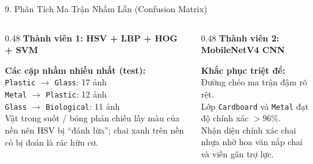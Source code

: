 \documentclass[aspectratio=169, 10pt]{beamer}
\begin{document}
\begin{frame}{9. Phân Tích Ma Trận Nhầm Lẫn (Confusion Matrix)}
\begin{columns}[T]
  \begin{column}{0.48\textwidth}
    \centering
    \textbf{Thành viên 1: HSV + LBP + HOG + SVM}\\
    \vspace{0.1cm}
    \begin{tcolorbox}[colback=white, colframe=UITBlue]
      \centering
      \small
      \alert{\textbf{Các cặp nhầm nhiều nhất (test):}}\\
      \texttt{Plastic} $\rightarrow$ \texttt{Glass}: 17 ảnh\\
      \texttt{Metal} $\rightarrow$ \texttt{Plastic}: 12 ảnh\\
      \texttt{Glass} $\rightarrow$ \texttt{Biological}: 11 ảnh\\
      Vật trong suốt / bóng phản chiếu lấy màu của nền nên HSV bị ``đánh lừa''; chai xanh trên nền cỏ bị đoán là rác hữu cơ.
    \end{tcolorbox}
  \end{column}

  \begin{column}{0.48\textwidth}
    \centering
    \textbf{Thành viên 2: MobileNetV4 CNN}\\
    \vspace{0.1cm}
    \begin{tcolorbox}[colback=white, colframe=GreenRecycle]
      \centering
      \small
      \textbf{Khắc phục triệt để:}\\
      Đường chéo ma trận đậm rõ rệt.\\
      Lớp \texttt{Cardboard} và \texttt{Metal} đạt độ chính xác $> 96\%$.\\
      Nhận diện chính xác chai nhựa nhờ hoa văn nắp chai và viền gân trợ lực.
    \end{tcolorbox}
  \end{column}
\end{columns}
\end{frame}
\end{document}
